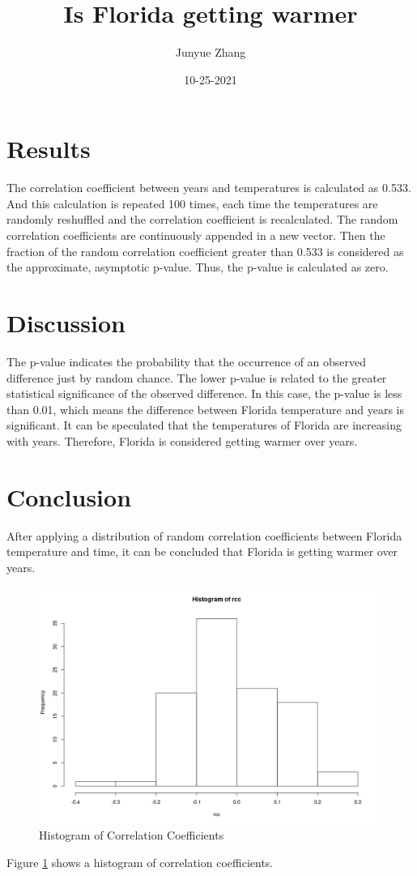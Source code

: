 \documentclass[10pt, a4paper]{article}
\title{Is Florida getting warmer}
\author{Junyue Zhang}
\date{10-25-2021}
\begin{document}
  \maketitle
  
  \section{Results}
    The correlation coefficient between years and temperatures is calculated as 0.533. And this calculation is repeated 100 times, each time the temperatures are randomly reshuffled and the correlation coefficient is recalculated. The random correlation coefficients are continuously appended in a new vector. Then the fraction of the random correlation coefficient greater than 0.533 is considered as the approximate, asymptotic p-value. 
    Thus, the p-value is calculated as zero.  
   
  \section{Discussion}
    The p-value indicates the probability that the occurrence of an observed difference just by random chance. The lower p-value is related to the greater statistical significance of the observed difference.
    In this case, the p-value is less than 0.01, which means the difference between Florida temperature and years is significant.
    It can be speculated that the temperatures of Florida are increasing with years.  
    Therefore, Florida is considered getting warmer over years.

  \section{Conclusion}
    After applying a distribution of random correlation coefficients between Florida temperature and time, it can be concluded that Florida is getting warmer over years.

\begin{figure}[h]
  \centering
  \includegraphics[scale = 0.3]{./histogram_of_rcc.png}
  \caption{Histogram of Correlation Coefficients}
  \label{figure1}
\end{figure}
Figure \ref{figure1} shows a histogram of correlation coefficients.
\end{document}
